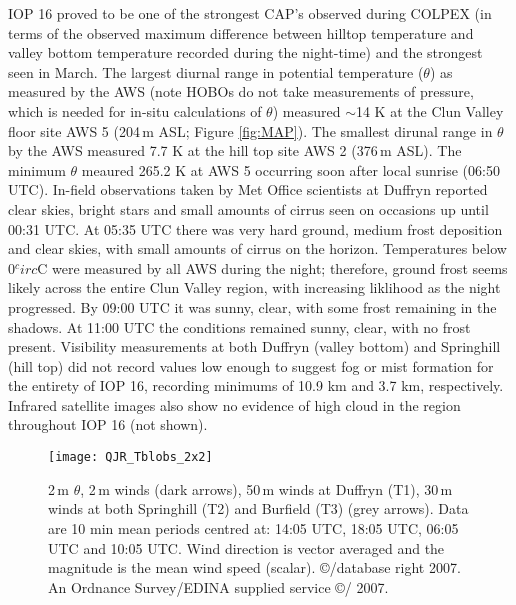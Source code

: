 \documentclass[times]{qjrms4}
\begin{document}
IOP 16 proved to be one of the strongest CAP's observed during COLPEX (in terms of the observed maximum difference between hilltop temperature and valley bottom temperature recorded during the night-time) and the strongest seen in March. The largest diurnal range in potential temperature ($\theta$) as measured by the AWS (note HOBOs do not take measurements of pressure, which is needed for in-situ calculations of $\theta$) measured $\sim$14 K at the Clun Valley floor site AWS 5 (204$\,\mbox{m}$ ASL; Figure \ref{fig:MAP}). The smallest dirunal range in $\theta$ by the AWS measured 7.7 K at the hill top site AWS 2 (376$\,\mbox{m}$ ASL). The minimum $\theta$ meaured 265.2 K at AWS 5 occurring soon after local sunrise (06:50 UTC). In-field observations taken by Met Office scientists at Duffryn reported clear skies, bright stars and small amounts of cirrus seen on occasions up until 00:31 UTC. At 05:35 UTC there was very hard ground, medium frost deposition and clear skies, with small amounts of cirrus on the horizon. Temperatures below 0$^circ$C were measured by all AWS during the night; therefore, ground frost seems likely across the entire Clun Valley region, with increasing liklihood as the night progressed. By 09:00 UTC it was sunny, clear, with some frost remaining in the shadows. At 11:00 UTC the conditions remained sunny, clear, with no frost present. Visibility measurements at both Duffryn (valley bottom) and Springhill (hill top) did not record values low enough to suggest fog or mist formation for the entirety of IOP 16, recording minimums of 10.9 km and 3.7 km, respectively. Infrared satellite images also show no evidence of high cloud in the region throughout IOP 16 (not shown).
        \begin{figure*}
        \centering
        \texttt{[image: QJR\_Tblobs\_2x2]}
        \caption{2$\,\mbox{m}$ $\theta$, 2$\,\mbox{m}$ winds (dark arrows), 50$\,\mbox{m}$ winds at Duffryn (T1), 30$\,\mbox{m}$ winds at both Springhill (T2) and Burfield (T3) (grey arrows). Data are 10 min mean periods centred at: 14:05 UTC, 18:05 UTC, 06:05 UTC and 10:05 UTC. Wind direction is vector averaged and the magnitude is the mean wind speed (scalar). \copyright/database right 2007. An Ordnance Survey/EDINA supplied service \copyright/ 2007.}
        \label{fig:Tblobs}
        \end{figure*}
\end{document}
